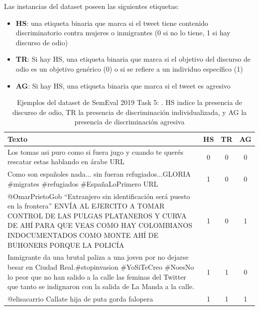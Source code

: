 Las instancias del dataset poseen las siguientes etiquetas:

\begin{itemize}
    \item \textbf{HS}: una etiqueta binaria que marca si el tweet tiene contenido discriminatorio contra mujeres o inmigrantes (0 si no lo tiene, 1 si hay discurso de odio)
    \item \textbf{TR}: Si hay HS, una etiqueta binaria que marca si el objetivo del discurso de odio es un objetivo genérico (0) o si se refiere a un individuo específico (1)
    \item \textbf{AG}: Si hay HS, una etiqueta binaria que marca si el tweet es agresivo
\end{itemize}

\begin{table}
    \centering
    \small
    \begin{tabularx}{\textwidth}{X c c c}
        Texto & HS & TR & AG \\
        \hline
        Los tomas asi puro como si fuera jugo y cuando te querés rescatar estas hablando en árabe URL & 0 & 0 & 0 \\
        \rule{0pt}{4ex}Como son españoles nada... sin fueran refugiados...GLORIA \#migrates \#refugiados \#EspañaLoPrimero URL & 1 & 0 & 0 \\
        \rule{0pt}{4ex}@OmarPrietoGob ``Extranjero sin identificación será puesto en la frontera'' ENVÍA AL EJERCITO A TOMAR CONTROL DE LAS PULGAS PLATANEROS Y CURVA DE AHÍ PARA QUE VEAS COMO HAY COLOMBIANOS INDOCUMENTADOS COMO MONTE AHÍ DE BUHONERS PORQUE LA POLICÍA & 1 & 0 & 1 \\
        \rule{0pt}{4ex}Inmigrante da una brutal paliza a una joven por no dejarse besar en Ciudad Real.\#stopinvasion \#YoSiTeCreo \#NoesNo lo peor que no han salido a la calle las feminas del Twitter que tanto se indignaron con la salida de La Manda a la calle. & 1 & 1 & 0 \\
        \rule{0pt}{4ex}@elisacarrio Callate hija de puta gorda falopera & 1 & 1 & 1 \\
        \hline
    \end{tabularx}
    \caption{Ejemplos del dataset de SemEval 2019 Task 5: \hateval{}. HS indice la presencia de discurso de odio, TR la presencia de discriminación individualizada, y AG la presencia de discriminación agresiva}
    \label{tab:hateval_dataset_examples}
\end{table}



